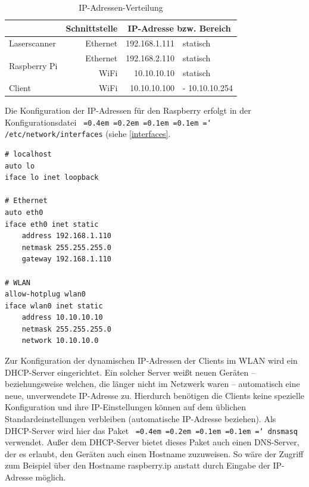 \documentclass[a4paper,12pt,bibliography=totoc, listof=totoc,titlepage,pointlessnumbers]{scrreprt}
\newcommand*\justify{%
  \fontdimen2\font=0.4em%
  \fontdimen3\font=0.2em%
  \fontdimen4\font=0.1em%
  \fontdimen7\font=0.1em%
  \hyphenchar\font=`\-%
}
\newcommand{\code}[1]{\texttt{\justify{#1}}}
\begin{document}
\begin{table}
\centering
\begin{tabular}{l|r|r|l|}
\cline{2-4}
                                                    & Schnittstelle & \multicolumn{2}{c|}{IP-Adresse bzw. Bereich} \\ \hline
\multicolumn{1}{|l|}{Laser\-scan\-ner}                  & Ethernet      & 192.168.1.111        & statisch              \\ \hline
\multicolumn{1}{|l|}{\multirow{2}{*}{Raspberry Pi}} & Ethernet      & 192.168.2.110        & statisch              \\ \cline{2-4} 
\multicolumn{1}{|l|}{}                              & WiFi          & 10.10.10.10          & statisch              \\ \hline
\multicolumn{1}{|l|}{Client}                        & WiFi          & 10.10.10.100         & - 10.10.10.254        \\ \hline
\end{tabular}
\caption{IP-Adressen-Verteilung}
\label{tab:ipAdressen}
\end{table}

Die Konfiguration der IP-Adressen für den Raspberry erfolgt in der Konfigurationsdatei \code{/etc/network/interfaces} (siehe \autoref{interfaces}. \cite{accesspoint}

\begin{lstlisting}[caption={Konfiguration der \code{/etc/network/interfaces}}, label={interfaces}]
# localhost
auto lo
iface lo inet loopback

# Ethernet
auto eth0
iface eth0 inet static
	address 192.168.1.110
	netmask 255.255.255.0
	gateway 192.168.1.110

# WLAN
allow-hotplug wlan0
iface wlan0 inet static
	address 10.10.10.10
	netmask 255.255.255.0
	network 10.10.10.0
\end{lstlisting}

Zur Konfiguration der dynamischen IP-Adressen der Clients im WLAN wird ein DHCP-Server eingerichtet. Ein solcher Server weißt neuen Geräten -- beziehungsweise welchen, die länger nicht im Netzwerk waren -- automatisch eine neue, unverwendete IP-Adresse zu. Hierdurch benötigen die Clients keine spezielle Konfiguration und ihre IP-Einstellungen können auf dem üblichen Standardeinstellungen verbleiben (automatische IP-Adresse beziehen). Als DHCP-Server wird hier das Paket \code{dnsmasq} verwendet. Außer dem DHCP-Server bietet dieses Paket auch einen DNS-Server, der es erlaubt, den Geräten auch einen Hostname zuzuweisen. So wäre der Zugriff zum Beispiel über den Hostname raspberry.ip anstatt durch Eingabe der IP-Adresse möglich.
\end{document}
